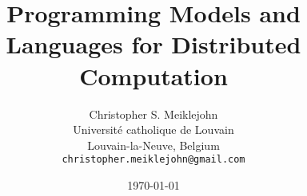 \documentclass[11pt,twoside,a4paper]{article}
\theoremstyle{definition}
\theoremstyle{definition}
\theoremstyle{remark}
\begin{document}
\title{Programming Models and Languages for Distributed Computation}

\author{Christopher S. Meiklejohn\\
  Universit\'e catholique de Louvain\\
  Louvain-la-Neuve, Belgium\\
  \texttt{christopher.meiklejohn@gmail.com}}
  
\date{\today}
\maketitle

\tableofcontents

\clearpage





\end{document}
